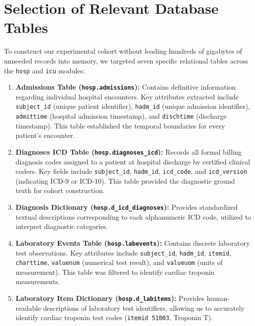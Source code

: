 \documentclass[12pt,a4paper,oneside]{report}
\begin{document}
\section{Selection of Relevant Database Tables}
\label{sec:table_selection}

To construct our experimental cohort without loading hundreds of gigabytes of unneeded records into memory, we targeted seven specific relational tables across the \texttt{hosp} and \texttt{icu} modules:

\begin{enumerate}
    \item \textbf{Admissions Table (\texttt{hosp.admissions}):} Contains definitive information regarding individual hospital encounters. Key attributes extracted include \texttt{subject\_id} (unique patient identifier), \texttt{hadm\_id} (unique admission identifier), \texttt{admittime} (hospital admission timestamp), and \texttt{dischtime} (discharge timestamp). This table established the temporal boundaries for every patient's encounter.
    
    \item \textbf{Diagnoses ICD Table (\texttt{hosp.diagnoses\_icd}):} Records all formal billing diagnosis codes assigned to a patient at hospital discharge by certified clinical coders. Key fields include \texttt{subject\_id}, \texttt{hadm\_id}, \texttt{icd\_code}, and \texttt{icd\_version} (indicating ICD-9 or ICD-10). This table provided the diagnostic ground truth for cohort construction.
    
    \item \textbf{Diagnosis Dictionary (\texttt{hosp.d\_icd\_diagnoses}):} Provides standardized textual descriptions corresponding to each alphanumeric ICD code, utilized to interpret diagnostic categories.
    
    \item \textbf{Laboratory Events Table (\texttt{hosp.labevents}):} Contains discrete laboratory test observations. Key attributes include \texttt{subject\_id}, \texttt{hadm\_id}, \texttt{itemid}, \texttt{charttime}, \texttt{valuenum} (numerical test result), and \texttt{valueuom} (units of measurement). This table was filtered to identify cardiac troponin measurements.
    
    \item \textbf{Laboratory Item Dictionary (\texttt{hosp.d\_labitems}):} Provides human-readable descriptions of laboratory test identifiers, allowing us to accurately identify cardiac troponin test codes (\texttt{itemid 51003}, Troponin T).
    

\end{enumerate}
\end{document}
